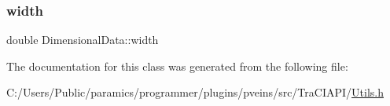 \mbox{\label{class_dimensional_data_a5ed5474d8c61c0871189f083c76a39f9}} 
\subsubsection{\texorpdfstring{width}{width}}
{\footnotesize\ttfamily double Dimensional\+Data\+::width}



The documentation for this class was generated from the following file\+:\begin{DoxyCompactItemize}
\item 
C\+:/\+Users/\+Public/paramics/programmer/plugins/pveins/src/\+Tra\+C\+I\+A\+P\+I/\hyperlink{_utils_8h}{Utils.\+h}\end{DoxyCompactItemize}
